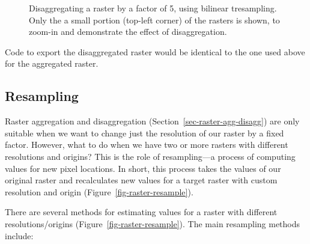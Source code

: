 \documentclass[
  letterpaper,
]{krantz}
\begin{document}
\begin{figure}

\begin{minipage}{0.50\linewidth}



\end{minipage}%
%
\begin{minipage}{0.50\linewidth}



\end{minipage}%

\caption{\label{fig-raster-disaggregate}Disaggregating a raster by a
factor of 5, using bilinear tresampling. Only the a small portion
(top-left corner) of the rasters is shown, to zoom-in and demonstrate
the effect of disaggregation.}

\end{figure}%

Code to export the disaggregated raster would be identical to the one
used above for the aggregated raster.

\subsection{Resampling}\label{sec-raster-resampling}

Raster aggregation and disaggregation
(Section~\ref{sec-raster-agg-disagg}) are only suitable when we want to
change just the resolution of our raster by a fixed factor. However,
what to do when we have two or more rasters with different resolutions
and origins? This is the role of resampling---a process of computing
values for new pixel locations. In short, this process takes the values
of our original raster and recalculates new values for a target raster
with custom resolution and origin (Figure~\ref{fig-raster-resample}).

There are several methods for estimating values for a raster with
different resolutions/origins (Figure~\ref{fig-raster-resample}). The
main resampling methods include:
\end{document}
